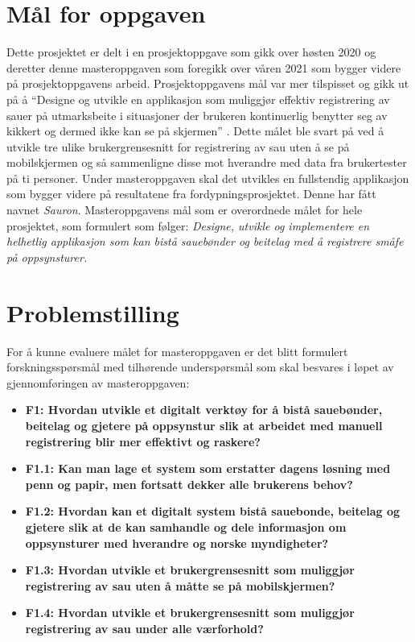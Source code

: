 \section{Mål for oppgaven} \label{sec:mal-for-oppgaven}
Dette prosjektet er delt i en prosjektoppgave \cite{Abtahi2020TilsynBeite} som gikk over høsten 2020 og deretter denne masteroppgaven som foregikk over våren 2021 som bygger videre på prosjektoppgavens arbeid. Prosjektoppgavens mål var mer tilspisset og gikk ut på å \enquote{Designe og utvikle en applikasjon som muliggjør effektiv registrering av sauer på utmarksbeite i situasjoner der brukeren kontinuerlig benytter seg av kikkert og dermed ikke kan se på skjermen} \cite[~s.3]{Abtahi2020TilsynBeite}. Dette målet ble svart på ved å utvikle tre ulike brukergrensesnitt for registrering av sau uten å se på mobilskjermen og så sammenligne disse mot hverandre med data fra brukertester på ti personer. Under masteroppgaven skal det utvikles en fullstendig applikasjon som bygger videre på resultatene fra fordypningsprosjektet. Denne har fått navnet \textit{Sauron}. Masteroppgavens mål som er overordnede målet for hele prosjektet, som formulert som følger:
\newline
\newline
\textit{Designe, utvikle og implementere en helhetlig applikasjon som kan bistå sauebønder og beitelag med å registrere småfe på oppsynsturer.}

\section{Problemstilling} \label{sec:problemstilling}
For å kunne evaluere målet for masteroppgaven er det blitt formulert forskningsspørsmål med tilhørende underspørsmål som skal besvares i løpet av gjennomføringen av masteroppgaven: 
\begin{itemize}
    \item \textbf{F1: Hvordan utvikle et digitalt verktøy for å bistå sauebønder, beitelag og gjetere på oppsynstur slik at arbeidet med manuell registrering blir mer effektivt og raskere?}
    \item \textbf{F1.1: Kan man lage et system som erstatter dagens løsning med penn og papir, men fortsatt dekker alle brukerens behov?}
    \item \textbf{F1.2: Hvordan kan et digitalt system bistå sauebonde, beitelag og gjetere slik at de kan samhandle og dele informasjon om oppsynsturer med hverandre og norske myndigheter?}
    \item \textbf{F1.3: Hvordan utvikle et brukergrensesnitt som muliggjør registrering av sau uten å måtte se på mobilskjermen?}
    \item \textbf{F1.4: Hvordan utvikle et brukergrensesnitt som muliggjør registrering av sau under alle værforhold?}
\end{itemize}
